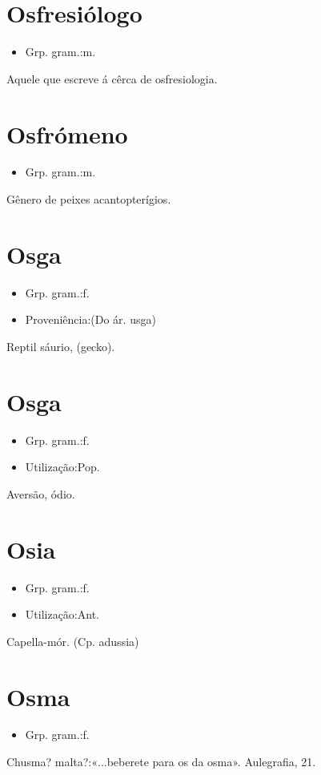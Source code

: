 \section{Osfresiólogo}
\begin{itemize}
\item {Grp. gram.:m.}
\end{itemize}
Aquele que escreve á cêrca de osfresiologia.
\section{Osfrómeno}
\begin{itemize}
\item {Grp. gram.:m.}
\end{itemize}
Gênero de peixes acantopterígios.
\section{Osga}
\begin{itemize}
\item {Grp. gram.:f.}
\end{itemize}
\begin{itemize}
\item {Proveniência:(Do ár. \textunderscore usga\textunderscore )}
\end{itemize}
Reptil sáurio, (\textunderscore gecko\textunderscore ).
\section{Osga}
\begin{itemize}
\item {Grp. gram.:f.}
\end{itemize}
\begin{itemize}
\item {Utilização:Pop.}
\end{itemize}
Aversão, ódio.
\section{Osia}
\begin{itemize}
\item {Grp. gram.:f.}
\end{itemize}
\begin{itemize}
\item {Utilização:Ant.}
\end{itemize}
Capella-mór.
(Cp. \textunderscore adussia\textunderscore )
\section{Osma}
\begin{itemize}
\item {Grp. gram.:f.}
\end{itemize}
Chusma? malta?:«\textunderscore ...beberete para os da osma\textunderscore ». \textunderscore Aulegrafia\textunderscore , 21.
